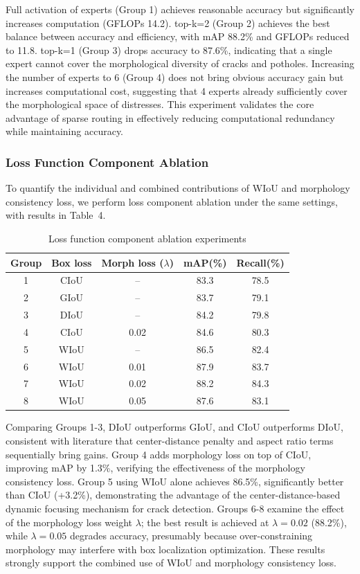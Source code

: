 \documentclass[twocolumn]{sn-jnl}
\begin{document}
	Full activation of experts (Group 1) achieves reasonable accuracy but significantly increases computation (GFLOPs 14.2). top-k=2 (Group 2) achieves the best balance between accuracy and efficiency, with mAP 88.2\% and GFLOPs reduced to 11.8. top-k=1 (Group 3) drops accuracy to 87.6\%, indicating that a single expert cannot cover the morphological diversity of cracks and potholes. Increasing the number of experts to 6 (Group 4) does not bring obvious accuracy gain but increases computational cost, suggesting that 4 experts already sufficiently cover the morphological space of distresses. This experiment validates the core advantage of sparse routing in effectively reducing computational redundancy while maintaining accuracy.
	
	\subsubsection{Loss Function Component Ablation}
	To quantify the individual and combined contributions of WIoU and morphology consistency loss, we perform loss component ablation under the same settings, with results in Table~4.
	
	\begin{table}[htbp]
		\centering
		\caption{Loss function component ablation experiments}
		\begin{tabular}{ccccc}
			\toprule
			Group & Box loss & Morph loss ($\lambda$) & mAP(\%) & Recall(\%) \\
			\midrule
			1 & CIoU & -- & 83.3 & 78.5 \\
			2 & GIoU & -- & 83.7 & 79.1 \\
			3 & DIoU & -- & 84.2 & 79.8 \\
			4 & CIoU & 0.02 & 84.6 & 80.3 \\
			5 & WIoU & -- & 86.5 & 82.4 \\
			6 & WIoU & 0.01 & 87.9 & 83.7 \\
			7 & WIoU & 0.02 & 88.2 & 84.3 \\
			8 & WIoU & 0.05 & 87.6 & 83.1 \\
			\bottomrule
		\end{tabular}
		\label{tab:loss}
	\end{table}
	
	Comparing Groups 1-3, DIoU outperforms GIoU, and CIoU outperforms DIoU, consistent with literature that center-distance penalty and aspect ratio terms sequentially bring gains. Group 4 adds morphology loss on top of CIoU, improving mAP by 1.3\%, verifying the effectiveness of the morphology consistency loss. Group 5 using WIoU alone achieves 86.5\%, significantly better than CIoU (+3.2\%), demonstrating the advantage of the center-distance-based dynamic focusing mechanism for crack detection. Groups 6-8 examine the effect of the morphology loss weight $\lambda$; the best result is achieved at $\lambda=0.02$ (88.2\%), while $\lambda=0.05$ degrades accuracy, presumably because over-constraining morphology may interfere with box localization optimization. These results strongly support the combined use of WIoU and morphology consistency loss.
	
\end{document}
